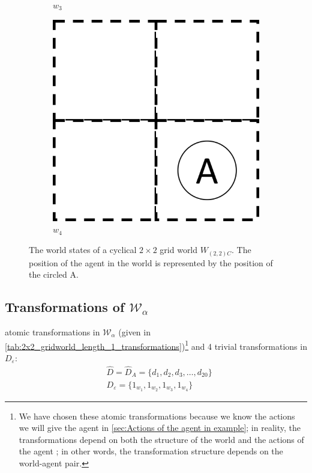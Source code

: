 \begin{figure}[H]
\begin{subfigure}[b]{0.45\linewidth}
		\caption{$w_{3}$}
	\end{subfigure}
	\begin{subfigure}[b]{0.45\linewidth}
		\centering
		\includegraphics[width=0.5\linewidth]{2MathematicalFramework/Images/2x2_no_walls_world_states/w3.png}
		\caption{$w_{4}$}
	\end{subfigure}
	\caption{
        The world states of a cyclical $2\times 2$ grid world $W_{(2,2)C}$.
        The position of the agent in the world is represented by the position of the circled A.
        }
	\label{fig:2x2-cyclical-grid-world-states}
\end{figure}

\subsection{Transformations of $\mathscr{W}_{\alpha}$}

 atomic transformations in $\mathscr{W}_{\alpha}$ (given in \cref{tab:2x2_gridworld_length_1_transformations})\footnote{
    We have chosen these atomic transformations because we know the actions we will give the agent in \cref{sec:Actions of the agent in example}; in reality, the transformations depend on both the structure of the world and the actions of the agent
    ; 
    in other words, the transformation structure depends on the world-agent pair.
}
and 4 trivial transformations in $D_{\varepsilon}$:
\begin{align}
    & \hat{D} = \hat{D}_{A} = \{ d_{1}, d_{2}, d_{3}, \dots, d_{20} \} \\
    & D_{\varepsilon} = \{1_{w_{1}}, 1_{w_{2}}, 1_{w_{3}}, 1_{w_{4}} \}
    \label{eqn:list_of_D_epsilon}
\end{align}

